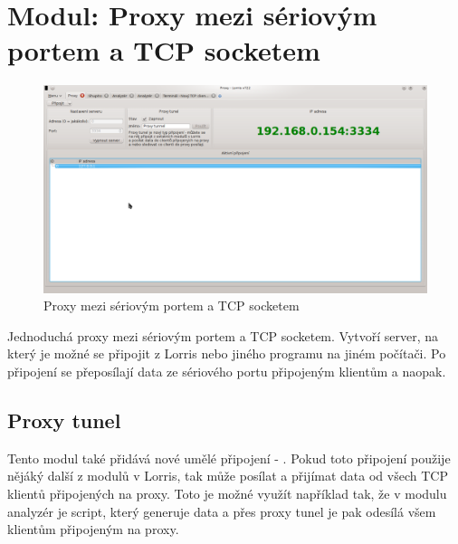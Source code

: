 \documentclass[12pt, a4paper, oneside]{article}
\begin{document}
\newpage
\setlength{\voffset}{0mm} %
\pagestyle{plain}

\section{Modul: Proxy mezi sériovým portem a TCP socketem}
\begin{figure}[H]
\begin{center}
\includegraphics[width=\textwidth]{img/proxy.png}
\caption{Proxy mezi sériovým portem a TCP socketem}
\label{Shupito}
\end{center}
\end{figure}
Jednoduchá proxy mezi sériovým portem a TCP socketem. Vytvoří server, na který je možné se připojit z Lorris nebo jiného programu na jiném počítači. Po připojení se přeposílají data ze sériového portu připojeným klientům a naopak.

\subsection{Proxy tunel}
Tento modul také přidává nové umělé připojení - . Pokud toto připojení použije nějáký další z modulů v Lorris, tak může posílat a přijímat data od všech TCP klientů připojených na proxy. Toto je možné využít například tak, že v modulu analyzér je script, který generuje data a přes proxy tunel je pak odesílá všem klientům připojeným na proxy.

\newpage
\setlength{\voffset}{0mm} %
\pagestyle{plain}
\end{document}
